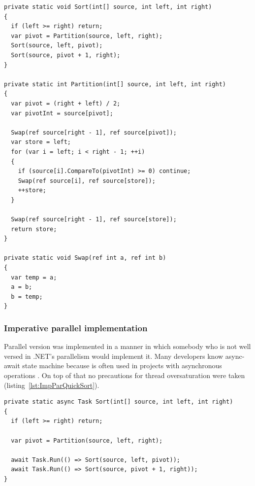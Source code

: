 \begin{lstlisting}[language={[sharp]c}, style=sharpcstyle, caption={Imperative sequential quicksort implementation}, label={lst:ImpSeqQuickSort},
numbers=none, xleftmargin=0pt,framexleftmargin=0pt,framexrightmargin=0pt,framexbottommargin=0pt]
private static void Sort(int[] source, int left, int right)
{
  if (left >= right) return;
  var pivot = Partition(source, left, right);
  Sort(source, left, pivot);
  Sort(source, pivot + 1, right);
}

private static int Partition(int[] source, int left, int right)
{
  var pivot = (right + left) / 2;
  var pivotInt = source[pivot];

  Swap(ref source[right - 1], ref source[pivot]);
  var store = left;
  for (var i = left; i < right - 1; ++i)
  {
    if (source[i].CompareTo(pivotInt) >= 0) continue;
    Swap(ref source[i], ref source[store]);
    ++store;
  }

  Swap(ref source[right - 1], ref source[store]);
  return store;
}

private static void Swap(ref int a, ref int b)
{
  var temp = a;
  a = b;
  b = temp;
}
\end{lstlisting}

\subsubsection{Imperative parallel implementation}
Parallel version was implemented in a manner in which somebody who is not well versed in .NET's parallelism would implement it. Many developers know async-await state machine because is often used in projects with asynchronous operations . On top of that no precautions for thread oversaturation were taken (listing~\ref{lst:ImpParQuickSort}).
\begin{lstlisting}[language={[sharp]c}, style=sharpcstyle, caption={Imperative parallel quicksort}, label={lst:ImpParQuickSort},
numbers=none, xleftmargin=0pt,framexleftmargin=0pt,framexrightmargin=0pt,framexbottommargin=0pt]
private static async Task Sort(int[] source, int left, int right)
{
  if (left >= right) return;

  var pivot = Partition(source, left, right);

  await Task.Run(() => Sort(source, left, pivot));
  await Task.Run(() => Sort(source, pivot + 1, right));
}
\end{lstlisting}

